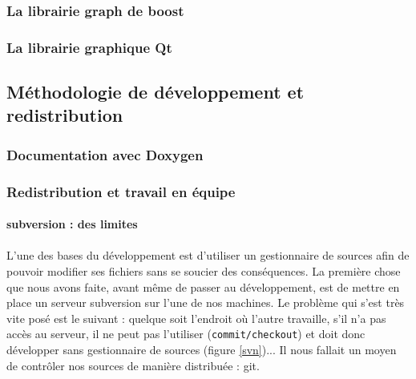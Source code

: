 \subsubsection{La librairie graph de boost}



\subsubsection{La librairie graphique Qt}


\subsection{Méthodologie de développement et redistribution}
\subsubsection{Documentation avec Doxygen}


\subsubsection{Redistribution et travail en équipe}
\paragraph{subversion : des limites}

\paragraph{} L'une des bases du développement est d'utiliser un gestionnaire de sources afin de pouvoir modifier ses fichiers sans se soucier des conséquences. La première chose que nous avons faite, avant même de passer au développement, est de mettre en place un serveur subversion sur l'une de nos machines. Le problème qui s'est très vite posé est le suivant : quelque soit l'endroit où l'autre travaille, s'il n'a pas accès au serveur, il ne peut pas l'utiliser (\verb|commit/checkout|) et doit donc développer sans gestionnaire de sources (figure \ref{svn})... Il nous fallait un moyen de contrôler nos sources de manière distribuée : git.

